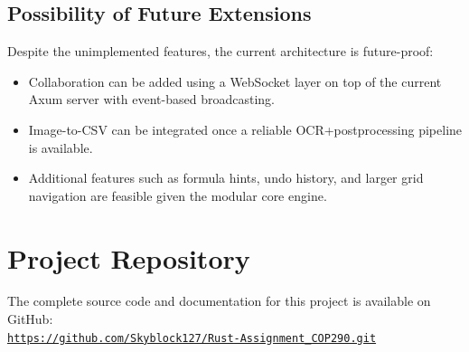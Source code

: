 \documentclass[11pt]{article}
\begin{document}
\subsection{Possibility of Future Extensions}

Despite the unimplemented features, the current architecture is future-proof:
\begin{itemize}
    \item Collaboration can be added using a WebSocket layer on top of the current Axum server with event-based broadcasting.
    \item Image-to-CSV can be integrated once a reliable OCR+postprocessing pipeline is available.
    \item Additional features such as formula hints, undo history, and larger grid navigation are feasible given the modular core engine.
\end{itemize}

\section*{Project Repository}

The complete source code and documentation for this project is available on GitHub:\\  
\href{https://github.com/Skyblock127/Rust-Assignment_COP290.git}{\texttt{https://github.com/Skyblock127/Rust-Assignment\_COP290.git}}
\end{document}
